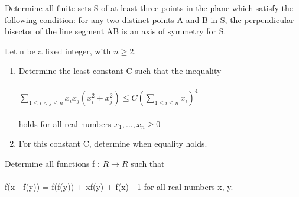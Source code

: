 
\item Determine all finite sets S of at least three points in the plane which satisfy the following condition:
for any two distinct points A and B in S, the perpendicular bisector of the line segment AB is an axis of symmetry for S.\\

\item Let n be a fixed integer, with $n \geq 2$.\\
\begin{enumerate}
\item Determine the least constant C such that the inequality\\
\\ $\sum_{1\leq i < j\leq n} x_ix_j(x_i^2 + x_j^2) \leq C(\sum_{1 \leq i \leq n}x_i)^4$\\
\\ holds for all real numbers $x_1, ... , x_n \geq 0$\\
\item For this constant C, determine when equality holds.
\end{enumerate}

\item Determine all functions f : $R \rightarrow R$ such that\\
\\ f(x - f(y)) = f(f(y)) + xf(y) + f(x) - 1 for all real numbers x, y.



